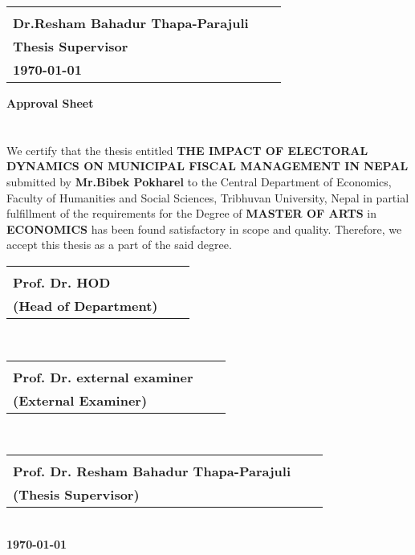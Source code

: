 \begin{tabular}{@{}p{3in}p{2in}p{2in}@{}}
\hrulefill \\
\textbf{Dr.Resham Bahadur Thapa-Parajuli} &&\\
\textbf{Thesis Supervisor} &&\\
\textbf{\today}\\
\end{tabular}


\newpage
\begin{center}
\textbf{\large Approval Sheet}
\end{center}
\section*{}

\vspace{-10mm}We certify that the thesis entitled \textbf{THE IMPACT OF ELECTORAL DYNAMICS ON MUNICIPAL FISCAL MANAGEMENT IN NEPAL} submitted by \textbf{Mr.Bibek Pokharel} to the Central Department of Economics, Faculty of Humanities
and Social Sciences, Tribhuvan University, Nepal in partial fulfillment of the requirements
for the Degree of \textbf{MASTER OF ARTS} in \textbf{ECONOMICS} has been found satisfactory in
scope and quality. Therefore, we accept this thesis as a part of the said degree.\vspace{15mm}\\

\begin{tabular}{@{}p{2.5in}p{2in}p{2in}@{}}
\hrulefill \\
\textbf{Prof. Dr. HOD} &&\\
\textbf{(Head of Department)} &&\\
\end{tabular}\vspace{15mm}\\

\begin{tabular}{@{}p{2.5in}p{2in}p{2in}@{}}
\hrulefill \\
\textbf{Prof. Dr. external examiner} &&\\
\textbf{(External Examiner)} &&\\
\end{tabular}\vspace{15mm}\\

\begin{tabular}{@{}p{2.5in}p{2in}p{2in}@{}}\hrulefill \\
\textbf{Prof. Dr. Resham Bahadur Thapa-Parajuli} &&\\
\textbf{(Thesis Supervisor)} &&\\
\end{tabular}\vspace{15mm}\\
\hspace{3mm}\textbf{\today}


